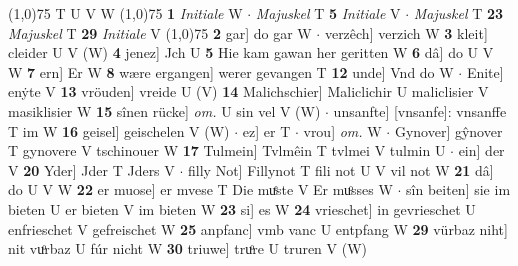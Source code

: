\documentclass[8pt,a4paper,notitlepage]{article}
\begin{document}
\begin{table}[ht]
\begin{minipage}[t]{0.5\linewidth}
\begin{tabular}{rl}
\end{tabular}
\scriptsize
\line(1,0){75} \newline
T U V W \newline
\line(1,0){75} \newline
\textbf{1} \textit{Initiale} W   $\cdot$ \textit{Majuskel} T  \textbf{5} \textit{Initiale} V   $\cdot$ \textit{Majuskel} T  \textbf{23} \textit{Majuskel} T  \textbf{29} \textit{Initiale} V  \newline
\line(1,0){75} \newline
\textbf{2} gar] do gar W  $\cdot$ verzêch] verzich W \textbf{3} kleit] cleider U V (W) \textbf{4} jenez] Jch U \textbf{5} Hie kam gawan her geritten W \textbf{6} dâ] do U V W \textbf{7} ern] Er W \textbf{8} wære ergangen] werer gevangen T \textbf{12} unde] Vnd do W  $\cdot$ Enite] enẏte V \textbf{13} vröuden] vreide U (V) \textbf{14} Malichschier] Maliclichir U maliclisier V masiklisier W \textbf{15} sînen rücke] \textit{om.} U sin vel V (W)  $\cdot$ unsanfte] [vnsanfe]: vnsanffe T im W \textbf{16} geisel] geischelen V (W)  $\cdot$ ez] er T  $\cdot$ vrou] \textit{om.} W  $\cdot$ Gynover] gŷnover T gynovere V tschinouer W \textbf{17} Tulmein] Tvlmêin T tvlmei V tulmin U  $\cdot$ ein] der V \textbf{20} Yder] Jder T Jders V  $\cdot$ filly Not] Fillynot T fili not U V vil not W \textbf{21} dâ] do U V W \textbf{22} er muose] er mvese T Die muͤste V Er muͦsses W  $\cdot$ sîn beiten] sie im bieten U er bieten V im bieten W \textbf{23} si] es W \textbf{24} vrieschet] in gevrieschet U enfrieschet V gefreischet W \textbf{25} anpfanc] vmb vanc U entpfang W \textbf{29} vürbaz niht] nit vuͦrbaz U fúr nicht W \textbf{30} triuwe] truͦre U truren V (W) \newline
\end{minipage}
\end{table}
\end{document}
